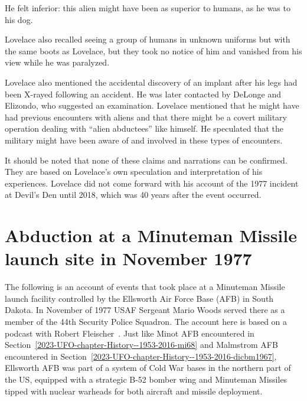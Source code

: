 He felt inferior: this alien might have been as superior to humans, as he was to his dog.

Lovelace also recalled seeing a group of humans in unknown uniforms but with the same boots as Lovelace, but they took no notice of him and vanished from his view while he was paralyzed.


Lovelace also mentioned the accidental discovery of an implant after his legs had been X-rayed following an accident.
He was later contacted by DeLonge and Elizondo, who suggested an examination.
Lovelace mentioned that he might have had previous encounters with aliens and that there might be a covert military operation dealing with
``alien abductees'' like himself.
He speculated that the military might have been aware of and involved in these types of encounters.

It should be noted that none of these claims and narrations can be confirmed. They are based on Lovelace's own speculation and interpretation of his experiences. Lovelace did not come forward with his account of the 1977 incident at Devil's Den until 2018, which was 40 years after the event occurred.


\section{Abduction at a Minuteman Missile launch site in November 1977}

\label{2023-UFO-chapter-History--1953-2016-mw77}

The following is an account of events that took place at a Minuteman Missile launch facility controlled by the
Ellsworth Air Force Base (AFB) in South Dakota. In November of 1977
USAF Sergeant  Mario Woods served there as a member of the 44th Security Police Squadron.
The account here is based on a podcast with Robert Fleischer~\cite{FleischerWoods2023Mar}.
Just like Minot AFB encountered in Section~\ref{2023-UFO-chapter-History--1953-2016-mi68}
and Malmstrom AFB encountered in Section~\ref{2023-UFO-chapter-History--1953-2016-dicbm1967},
Ellsworth AFB was part of a system of Cold War bases in the northern part of the US,
equipped with a
strategic B-52 bomber wing and  Minuteman Missiles tipped with nuclear warheads
for both aircraft and missile deployment.

